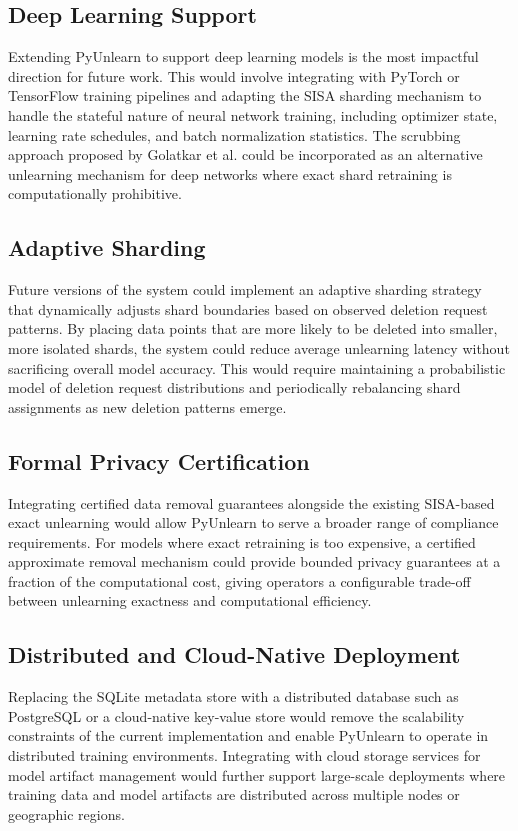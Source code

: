 \subsection{Deep Learning Support}
Extending PyUnlearn to support deep learning models is the most impactful direction for future work. This would involve integrating with PyTorch or TensorFlow training pipelines and adapting the SISA sharding mechanism to handle the stateful nature of neural network training, including optimizer state, learning rate schedules, and batch normalization statistics. The scrubbing approach proposed by Golatkar et al. \cite{golatkar2020eternal} could be incorporated as an alternative unlearning mechanism for deep networks where exact shard retraining is computationally prohibitive.

\subsection{Adaptive Sharding}
Future versions of the system could implement an adaptive sharding strategy that dynamically adjusts shard boundaries based on observed deletion request patterns. By placing data points that are more likely to be deleted into smaller, more isolated shards, the system could reduce average unlearning latency without sacrificing overall model accuracy. This would require maintaining a probabilistic model of deletion request distributions and periodically rebalancing shard assignments as new deletion patterns emerge.

\subsection{Formal Privacy Certification}
Integrating certified data removal guarantees \cite{guo2020certified} alongside the existing SISA-based exact unlearning would allow PyUnlearn to serve a broader range of compliance requirements. For models where exact retraining is too expensive, a certified approximate removal mechanism could provide bounded privacy guarantees at a fraction of the computational cost, giving operators a configurable trade-off between unlearning exactness and computational efficiency.

\subsection{Distributed and Cloud-Native Deployment}
Replacing the SQLite metadata store with a distributed database such as PostgreSQL or a cloud-native key-value store would remove the scalability constraints of the current implementation and enable PyUnlearn to operate in distributed training environments. Integrating with cloud storage services for model artifact management would further support large-scale deployments where training data and model artifacts are distributed across multiple nodes or geographic regions.

